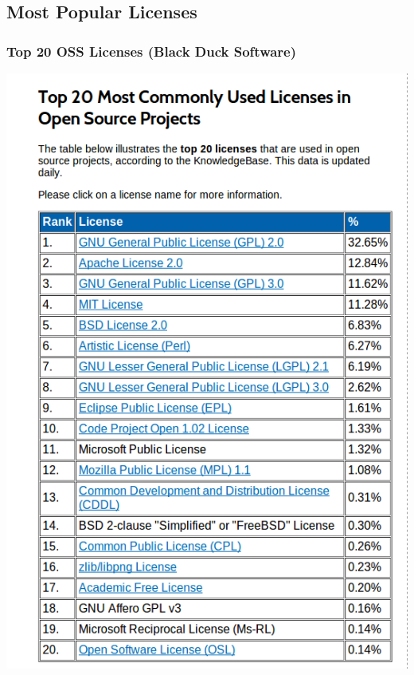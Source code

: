 \documentclass{beamer}
\begin{document}
\subsection{Most Popular Licenses}
\begin{frame}

\frametitle{Top 20 OSS Licenses (Black Duck Software)} 
\vspace{-0.25cm}
\begin{center}
\includegraphics[scale=0.25,clip=true]{figs/top20licenses.png}

\end{center}
\end{frame}

\end{document}
